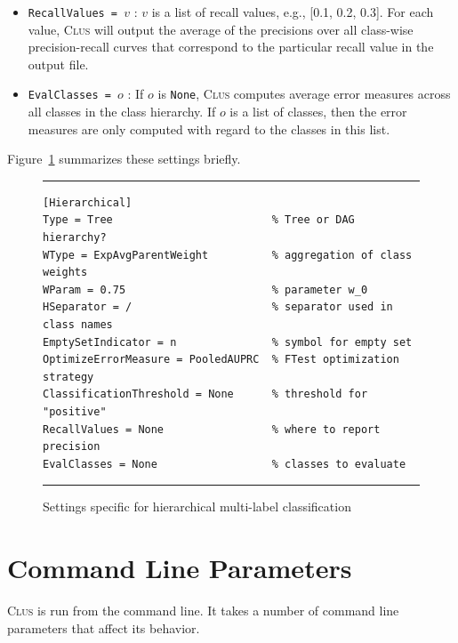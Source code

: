 \documentclass[a4paper]{report}
\newcommand{\clus}{\textsc{Clus}}
\begin{document}
\begin{itemize}
\item {\tt RecallValues = $v$} : $v$ is a list of recall values, e.g., [0.1, 0.2, 0.3]. For each value, \clus{} will output the average of the precisions over all class-wise precision-recall curves that correspond to the particular recall value in the output file.
\item {\tt EvalClasses = $o$} : If $o$ is {\tt None}, \clus{} computes average error measures across all classes in the class  hierarchy. If $o$ is a list of classes, then the error measures are only computed with regard to the classes in this list.
\end{itemize}
Figure~\ref{settings-hmc:fig} summarizes these settings briefly.

\begin{figure}[tb]
\hrule\vspace{1em}
\begin{verbatim}
[Hierarchical]
Type = Tree                         % Tree or DAG hierarchy?
WType = ExpAvgParentWeight          % aggregation of class weights
WParam = 0.75                       % parameter w_0
HSeparator = /                      % separator used in class names
EmptySetIndicator = n               % symbol for empty set
OptimizeErrorMeasure = PooledAUPRC  % FTest optimization strategy
ClassificationThreshold = None      % threshold for "positive"
RecallValues = None                 % where to report precision
EvalClasses = None                  % classes to evaluate
\end{verbatim}
\hrule
\caption{Settings specific for hierarchical multi-label classification}
\label{settings-hmc:fig}
\end{figure}

\chapter{Command Line Parameters}
\label{param:ch}

\clus{} is run from the command line.  It takes a number of command line parameters that affect its behavior.
\end{document}
